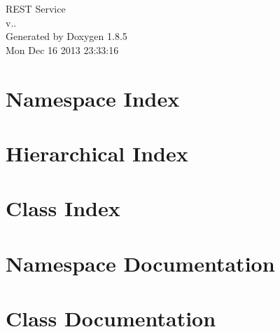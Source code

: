 \documentclass[twoside]{book}
\newcommand{\clearemptydoublepage}{%
  \newpage{\pagestyle{empty}\cleardoublepage}%
}
\begin{document}
\hypersetup{pageanchor=false}
\begin{titlepage}
\vspace*{7cm}
\begin{center}%
{\Large R\-E\-S\-T Service \\[1ex]\large v.. }\\
\vspace*{1cm}
{\large Generated by Doxygen 1.8.5}\\
\vspace*{0.5cm}
{\small Mon Dec 16 2013 23:33:16}\\
\end{center}
\end{titlepage}
\clearemptydoublepage
\tableofcontents
\clearemptydoublepage
{}
\hypersetup{pageanchor=true}

\chapter{Namespace Index}

\chapter{Hierarchical Index}

\chapter{Class Index}

\chapter{Namespace Documentation}



\chapter{Class Documentation}

















\newpage
{}
{}
\printindex
\end{document}
